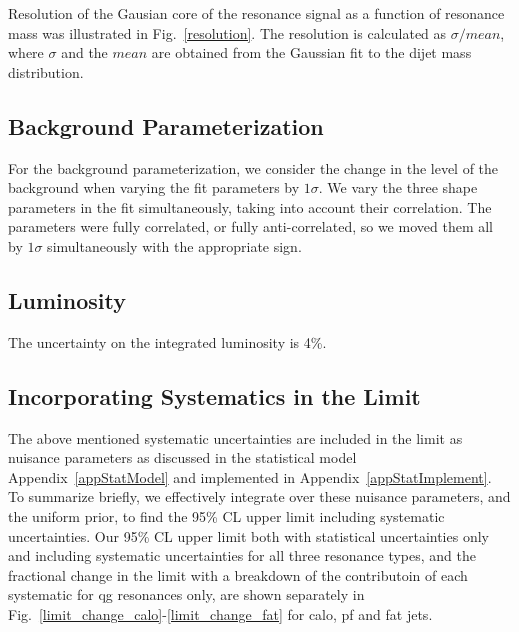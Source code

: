 Resolution of the Gausian core of the resonance signal as a function of resonance
mass was illustrated in Fig.~\ref{resolution}. The resolution is calculated as 
$\sigma/mean$, where $\sigma$ and the $mean$ are obtained from the Gaussian fit to the dijet mass distribution.



\subsection{Background Parameterization}
For the background parameterization, we consider the change in the level of the
background when varying the fit parameters by $1\sigma$. We vary the three shape 
parameters in the fit simultaneously, taking into account their correlation. The
parameters were fully correlated, or fully anti-correlated, so we moved them all 
by $1\sigma$ simultaneously with the appropriate sign.

\subsection{Luminosity}
The uncertainty on the integrated luminosity is 4\%.


\subsection{Incorporating Systematics in the Limit}

The above mentioned systematic uncertainties are included
in the limit as nuisance parameters as discussed in the statistical model Appendix~\ref{appStatModel}
and implemented in Appendix~\ref{appStatImplement}.
To summarize briefly, we effectively integrate over these nuisance parameters, and the uniform prior, 
to find the 95\% CL upper limit including systematic uncertainties. 
Our 95\% CL upper limit both with statistical uncertainties only and including systematic 
uncertainties  for all three resonance types, and the fractional change in the limit with a breakdown of
the contributoin of each systematic for qg resonances only, 
are shown separately in Fig.~\ref{limit_change_calo}-\ref{limit_change_fat} for calo, pf and fat jets.

